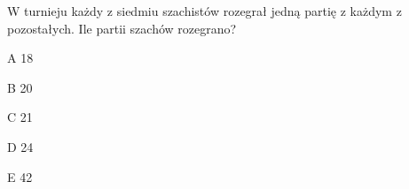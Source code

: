 \begin{tresc}
W turnieju każdy z siedmiu szachistów rozegrał jedną partię z każdym z pozostałych. Ile partii szachów rozegrano?
\end{tresc}
\begin{wariant}{A} 18 \end{wariant}
\begin{wariant}{B} 20 \end{wariant}
\begin{wariant}{C} 21 \end{wariant}
\begin{wariant}{D} 24 \end{wariant}
\begin{wariant}{E} 42 \end{wariant}

